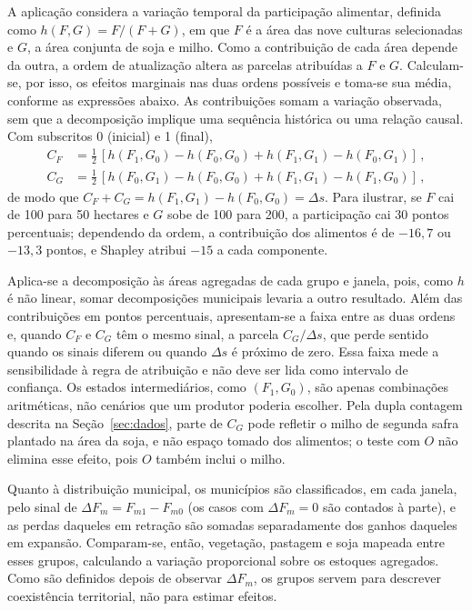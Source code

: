\documentclass[11pt,a4paper]{article}
\begin{document}
A aplicação considera a variação temporal da participação alimentar, definida como $h(F,G) = F/(F+G)$, em que $F$ é a área das nove culturas selecionadas e $G$, a área conjunta de soja e milho. Como a contribuição de cada área depende da outra, a ordem de atualização altera as parcelas atribuídas a $F$ e $G$. Calculam-se, por isso, os efeitos marginais nas duas ordens possíveis e toma-se sua média, conforme as expressões abaixo. As contribuições somam a variação observada, sem que a decomposição implique uma sequência histórica ou uma relação causal. Com subscritos 0 (inicial) e 1 (final),
\begin{align}
C_F &= \tfrac{1}{2}\,[h(F_1,G_0) - h(F_0,G_0) + h(F_1,G_1) - h(F_0,G_1)]\,, \\
C_G &= \tfrac{1}{2}\,[h(F_0,G_1) - h(F_0,G_0) + h(F_1,G_1) - h(F_1,G_0)]\,,
\end{align}
de modo que $C_F + C_G = h(F_1,G_1) - h(F_0,G_0) = \Delta s$. Para ilustrar, se $F$ cai de 100 para 50 hectares e $G$ sobe de 100 para 200, a participação cai 30 pontos percentuais; dependendo da ordem, a contribuição dos alimentos é de $-16{,}7$ ou $-13{,}3$ pontos, e Shapley atribui $-15$ a cada componente.

Aplica-se a decomposição às áreas agregadas de cada grupo e janela, pois, como $h$ é não linear, somar decomposições municipais levaria a outro resultado. Além das contribuições em pontos percentuais, apresentam-se a faixa entre as duas ordens e, quando $C_F$ e $C_G$ têm o mesmo sinal, a parcela $C_G/\Delta s$, que perde sentido quando os sinais diferem ou quando $\Delta s$ é próximo de zero. Essa faixa mede a sensibilidade à regra de atribuição e não deve ser lida como intervalo de confiança. Os estados intermediários, como $(F_1, G_0)$, são apenas combinações aritméticas, não cenários que um produtor poderia escolher. Pela dupla contagem descrita na Seção~\ref{sec:dados}, parte de $C_G$ pode refletir o milho de segunda safra plantado na área da soja, e não espaço tomado dos alimentos; o teste com $O$ não elimina esse efeito, pois $O$ também inclui o milho.

Quanto à distribuição municipal, os municípios são classificados, em cada janela, pelo sinal de $\Delta F_m = F_{m1} - F_{m0}$ (os casos com $\Delta F_m = 0$ são contados à parte), e as perdas daqueles em retração são somadas separadamente dos ganhos daqueles em expansão. Comparam-se, então, vegetação, pastagem e soja mapeada entre esses grupos, calculando a variação proporcional sobre os estoques agregados. Como são definidos depois de observar $\Delta F_m$, os grupos servem para descrever coexistência territorial, não para estimar efeitos.
\end{document}
